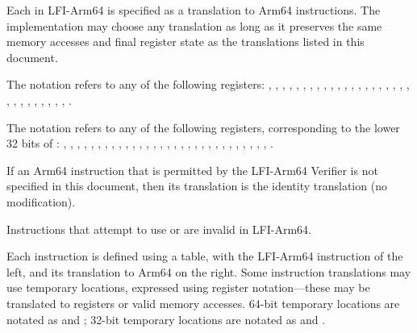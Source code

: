 
\providecommand{\xbase}{\code{x21}\xspace}
\providecommand{\xaddr}{\code{x18}\xspace}
\providecommand{\xret}{\code{x30}\xspace}
\providecommand{\xsp}{\code{sp}\xspace}



\specitem
Each  in LFI-Arm64 is specified as a translation to Arm64
instructions. The implementation may choose any translation as long as it
preserves the same memory accesses and final register state as the translations
listed in this document.


\specitem
The notation  refers to any of the following registers:
,
,
,
,
,
,
,
,
,
,
,
,
,
,
,
,
,
,
,
,
,
,
,
,
,
,
,
,
,
,
.

\specitem
The notation  refers to any of the following registers, corresponding to the lower 32 bits of :
,
,
,
,
,
,
,
,
,
,
,
,
,
,
,
,
,
,
,
,
,
,
,
,
,
,
,
,
,
,
.


\specitem
If an Arm64 instruction that is permitted by the LFI-Arm64 Verifier is not specified in this document, then its translation is the identity translation (no modification).

\specitem
Instructions that attempt to use \xbase or \xaddr are invalid in LFI-Arm64.

\specitem
Each instruction is defined using a table, with the LFI-Arm64 instruction of the left, and its translation to Arm64 on the right. Some instruction translations may use temporary locations, expressed using register notation---these may be translated to registers or valid memory accesses. 64-bit temporary locations are notated as  and ; 32-bit temporary locations are notated as  and .

